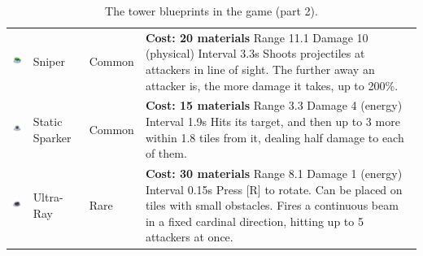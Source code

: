\begin{table}[H]
\begin{tabular}{m{15mm}m{20mm}lm{}}
        \includegraphics[height=15mm]{img/Icons/Towers/Sniper.png}         & Sniper         & Common          &
        \footnotesize{\textbf{Cost: 20 materials} \newline Range 11.1 \newline Damage 10 (physical) \newline Interval 3.3s \newline Shoots projectiles at attackers in line of sight. \newline The further away an attacker is, the more damage it takes, up to 200\%.}                                         \\

        \includegraphics[height=15mm]{img/Icons/Towers/Static Sparker.png} & Static Sparker & Common          &
        \footnotesize{\textbf{Cost: 15 materials} \newline Range 3.3 \newline Damage 4 (energy) \newline Interval 1.9s \newline Hits its target, and then up to 3 more within 1.8 tiles from it, dealing half damage to each of them.}                                                                          \\

        \includegraphics[height=15mm]{img/Icons/Towers/Ultra-Ray.png}      & Ultra-Ray      & Rare            &
        \footnotesize{\textbf{Cost: 30 materials} \newline Range 8.1 \newline Damage 1 (energy) \newline Interval 0.15s \newline Press [R] to rotate. \newline Can be placed on tiles with small obstacles. \newline Fires a continuous beam in a fixed cardinal direction, hitting up to 5 attackers at once.} \\
        \bottomrule
    \end{tabular}
    \caption{The tower blueprints in the game (part 2).}
    \label{tab:towers2}
\end{table}


